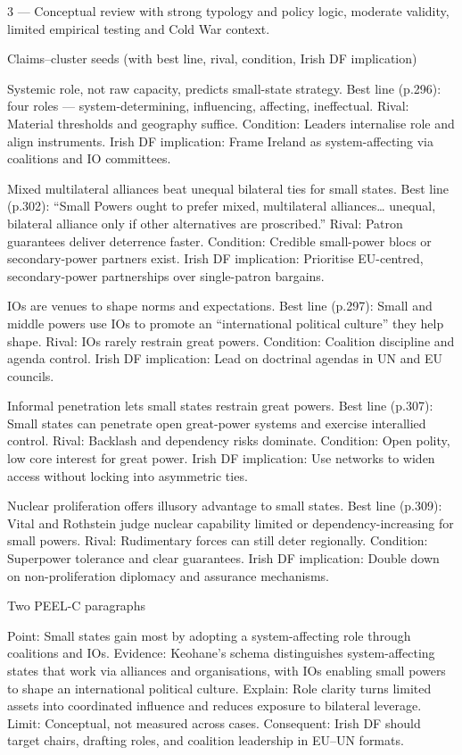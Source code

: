 3 — Conceptual review with strong typology and policy logic, moderate validity, limited empirical testing and Cold War context.

Claims–cluster seeds (with best line, rival, condition, Irish DF implication)

Systemic role, not raw capacity, predicts small-state strategy.
Best line (p.296): four roles — system-determining, influencing, affecting, ineffectual.
Rival: Material thresholds and geography suffice.
Condition: Leaders internalise role and align instruments.
Irish DF implication: Frame Ireland as system-affecting via coalitions and IO committees.

Mixed multilateral alliances beat unequal bilateral ties for small states.
Best line (p.302): “Small Powers ought to prefer mixed, multilateral alliances… unequal, bilateral alliance only if other alternatives are proscribed.”
Rival: Patron guarantees deliver deterrence faster.
Condition: Credible small-power blocs or secondary-power partners exist.
Irish DF implication: Prioritise EU-centred, secondary-power partnerships over single-patron bargains.

IOs are venues to shape norms and expectations.
Best line (p.297): Small and middle powers use IOs to promote an “international political culture” they help shape.
Rival: IOs rarely restrain great powers.
Condition: Coalition discipline and agenda control.
Irish DF implication: Lead on doctrinal agendas in UN and EU councils.

Informal penetration lets small states restrain great powers.
Best line (p.307): Small states can penetrate open great-power systems and exercise interallied control.
Rival: Backlash and dependency risks dominate.
Condition: Open polity, low core interest for great power.
Irish DF implication: Use networks to widen access without locking into asymmetric ties.

Nuclear proliferation offers illusory advantage to small states.
Best line (p.309): Vital and Rothstein judge nuclear capability limited or dependency-increasing for small powers.
Rival: Rudimentary forces can still deter regionally.
Condition: Superpower tolerance and clear guarantees.
Irish DF implication: Double down on non-proliferation diplomacy and assurance mechanisms.

Two PEEL-C paragraphs

Point: Small states gain most by adopting a system-affecting role through coalitions and IOs.
Evidence: Keohane’s schema distinguishes system-affecting states that work via alliances and organisations, with IOs enabling small powers to shape an international political culture.
Explain: Role clarity turns limited assets into coordinated influence and reduces exposure to bilateral leverage.
Limit: Conceptual, not measured across cases.
Consequent: Irish DF should target chairs, drafting roles, and coalition leadership in EU–UN formats.

